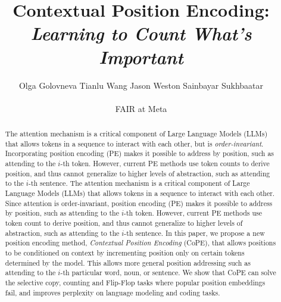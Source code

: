 \documentclass{article}
\title{Contextual Position Encoding:\\{\em Learning to Count What's Important} }
\author{
  Olga Golovneva
  \quad
  Tianlu Wang 
  \quad
  Jason Weston 
  \quad
  Sainbayar Sukhbaatar \\ \\
  FAIR at Meta
}
\newcommand{\oursfull}{Contextual Position Encoding}
\newcommand{\ours}{CoPE\xspace}
\begin{document}
\maketitle


\begin{abstract}
The attention mechanism is a critical component of Large Language Models (LLMs) that allows  tokens in a sequence to interact with each other, but is \textit{order-invariant}.
Incorporating position encoding (PE) makes it possible to address by position,
such as attending to the $i$-th token.
However, current PE methods use token counts to derive position, and thus cannot generalize to higher levels of abstraction, such as attending to the $i$-th sentence.
The attention mechanism is a critical component of Large Language Models (LLMs) that allows  tokens in a sequence to interact with each other.
Since %
attention is order-invariant,
position encoding (PE) makes it possible to address by position, such as attending to the $i$-th token.
However, current PE methods use token count to derive position, and thus cannot generalize to higher levels of abstraction, such as attending to the $i$-th sentence.
\fi
In this paper, we propose a new position encoding method, 
\emph{\oursfull{}} (\ours{}), that allows positions to be conditioned on context by incrementing position  only on certain tokens determined by the model.
This allows more general position addressing such as attending to  the $i$-th particular word, noun, or sentence.
We %
show that \ours{} can solve the selective copy, counting and Flip-Flop tasks  where popular position embeddings fail, and improves perplexity on language modeling and coding tasks.
\end{abstract}
\end{document}

